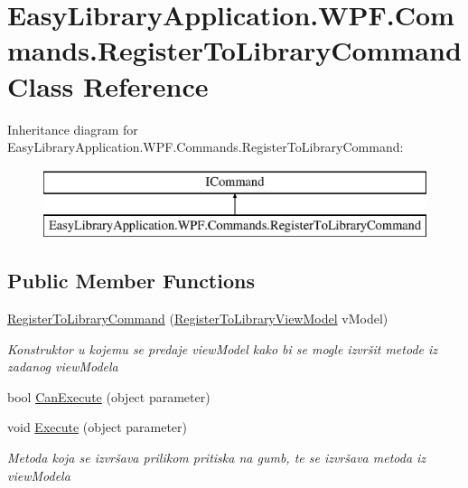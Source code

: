 \hypertarget{class_easy_library_application_1_1_w_p_f_1_1_commands_1_1_register_to_library_command}{}\section{Easy\+Library\+Application.\+W\+P\+F.\+Commands.\+Register\+To\+Library\+Command Class Reference}
\label{class_easy_library_application_1_1_w_p_f_1_1_commands_1_1_register_to_library_command}
Inheritance diagram for Easy\+Library\+Application.\+W\+P\+F.\+Commands.\+Register\+To\+Library\+Command\+:\begin{figure}[H]
\begin{center}
\leavevmode
\includegraphics[height=2.000000cm]{class_easy_library_application_1_1_w_p_f_1_1_commands_1_1_register_to_library_command}
\end{center}
\end{figure}
\subsection*{Public Member Functions}
\begin{DoxyCompactItemize}
\item 
\mbox{\hyperlink{class_easy_library_application_1_1_w_p_f_1_1_commands_1_1_register_to_library_command_a0c74cacb9c4e0bdc5d05d7c51ca0fb91}{Register\+To\+Library\+Command}} (\mbox{\hyperlink{class_easy_library_application_1_1_w_p_f_1_1_view_model_1_1_register_to_library_view_model}{Register\+To\+Library\+View\+Model}} v\+Model)
\begin{DoxyCompactList}\small\item\em Konstruktor u kojemu se predaje view\+Model kako bi se mogle izvršit metode iz zadanog view\+Modela \end{DoxyCompactList}\item 
bool \mbox{\hyperlink{class_easy_library_application_1_1_w_p_f_1_1_commands_1_1_register_to_library_command_ac754dca996e646a9c5f48c85a621df79}{Can\+Execute}} (object parameter)
\item 
void \mbox{\hyperlink{class_easy_library_application_1_1_w_p_f_1_1_commands_1_1_register_to_library_command_a83243e09b17b415fd91f4566b3607c95}{Execute}} (object parameter)
\begin{DoxyCompactList}\small\item\em Metoda koja se izvršava prilikom pritiska na gumb, te se izvršava metoda iz view\+Modela \end{DoxyCompactList}\end{DoxyCompactItemize}
